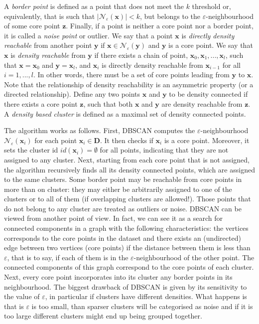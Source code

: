 \documentclass[a4paper]{article}
\begin{document}
	A \textit{border point} is defined as a point that does not meet the $k$ threshold or, equivalently, that is such that $|\mathcal{N}_{\varepsilon}(\boldsymbol{x})| < k$, but belongs to the $\varepsilon$-neighbourhood of some core point $\boldsymbol{z}$.
	Finally, if a point is neither a core point nor a border point, it is called a \textit{noise point} or outlier.
	We say that a point $\boldsymbol{x}$ is \textit{directly density reachable} from another point $\boldsymbol{y}$ if $\boldsymbol{x} \in \mathcal{N}_{\varepsilon} \left( \boldsymbol{y} \right)$ and $\boldsymbol{y}$ is a core point.
	We say that $\boldsymbol{x}$ is \textit{density reachable} from $\boldsymbol{y}$ if there exists a chain of point, $\boldsymbol{x}_{0}, \boldsymbol{x}_{1}, ..., \boldsymbol{x}_{l}$, such that $\boldsymbol{x}=\boldsymbol{x}_{0}$ and $\boldsymbol{y} = \boldsymbol{x}_{l}$, and $\boldsymbol{x}_{i}$ is directly density reachable from $\boldsymbol{x}_{i-1}$ for all $i=1,...,l$.
	In other words, there must be a set of core points leading from $\boldsymbol{y}$ to $\boldsymbol{x}$. Note that the relationship of density reachability is an asymmetric property (or a directed relationship).
	Define any two points $\boldsymbol{x}$ and $\boldsymbol{y}$ to be density connected if there exists a core point $\boldsymbol{z}$, such that both $\boldsymbol{x}$ and $\boldsymbol{y}$ are density reachable from $\boldsymbol{z}$.
	A \textit{density based cluster} is defined as a maximal set of density connected points.
	
	The algorithm works as follows. First, DBSCAN computes the $\varepsilon$-neighbourhood $\mathcal{N}_{\varepsilon} \left( \boldsymbol{x}_{i} \right)$ for each point $\boldsymbol{x}_{i} \in \boldsymbol{D}$. It then checks if $\boldsymbol{x}_{i}$ is a core point. Moreover, it sets the cluster id $id\left(\boldsymbol{x}_{i}\right) = \emptyset$ for all points, indicating that they are not assigned to any cluster.
	Next, starting from each core point that is not assigned, the algorithm recursively finds all its density connected points, which are assigned to the same clusters. Some border point may be reachable from core points in more than on cluster: they may either be arbitrarily assigned to one of the clusters or to all of them (if overlapping clusters are allowed!).
	Those points that do not belong to any cluster are treated as outliers or noise.
	DBSCAN can be viewed from another point of view. In fact, we can see it as a search for connected components in a graph with the following characteristics: the vertices corresponds to the core points in the dataset and there exists an (undirected) edge between two vertices (core points) if the distance between them is less than $\varepsilon$, that is to say, if each of them is in the $\varepsilon$-neighbourhood of the other point.
	The connected components of this graph correspond to the core points of each cluster. Next, every core point incorporates into its cluster any border points in its neighbourhood.
	The biggest drawback of DBSCAN is given by its sensitivity to the value of $\varepsilon$, in particular if clusters have different densities. What happens is that is $\varepsilon$ is too small, than sparser clusters will be categorised as noise and if it is too large different clusters might end up being grouped together.
	
\end{document}

